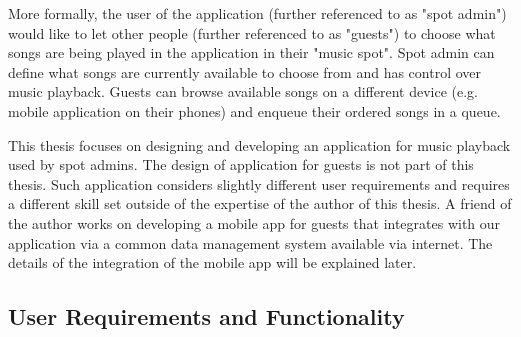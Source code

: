 \par
More formally, the user of the application (further referenced to as "spot admin") would like to let other people (further referenced to as "guests") to choose what songs are being played in the application in their "music spot". Spot admin can define what songs are currently available to choose from and has control over music playback. Guests can browse available songs on a different device (e.g. mobile application on their phones) and enqueue their ordered songs in a queue.
\par
This thesis focuses on designing and developing an application for music playback used by spot admins. The design of application for guests is not part of this thesis. Such application considers slightly different user requirements and requires a different skill set outside of the expertise of the author of this thesis. A friend of the author works on developing a mobile app for guests that integrates with our application via a common data management system available via internet. The details of the integration of the mobile app will be explained later.

\subsection{User Requirements and Functionality}

